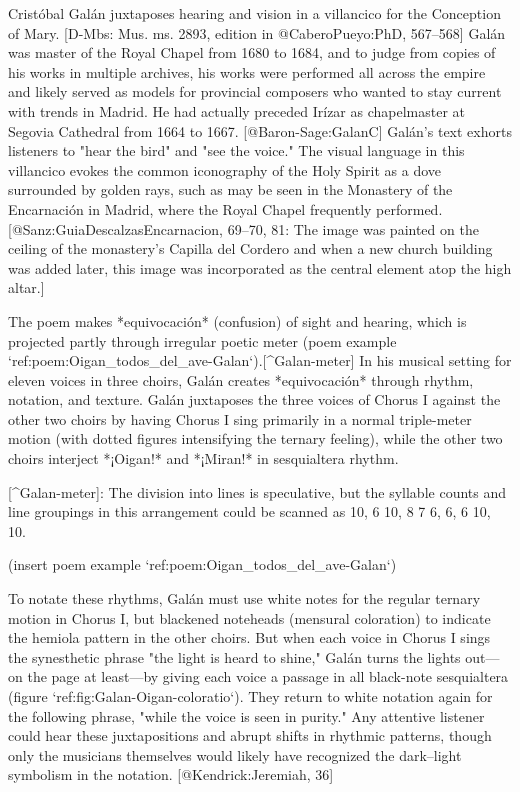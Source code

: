 Cristóbal Galán juxtaposes hearing and vision in a villancico
for the Conception of Mary. 
[D-Mbs: Mus. ms. 2893, edition in @CaberoPueyo:PhD, 567--568]
Galán was master of the Royal Chapel from 1680 to 1684, and to judge from
copies of his works in multiple archives, his works were performed all across
the empire and likely served as models for provincial composers who wanted to
stay current with trends in Madrid.
He had actually preceded Irízar as chapelmaster at Segovia Cathedral from 1664
to 1667.
[@Baron-Sage:GalanC]
Galán's text exhorts listeners to "hear the bird" and "see the voice."
The visual language in this villancico evokes the common iconography of the
Holy Spirit as a dove surrounded by golden rays, such as may be seen in the
Monastery of the Encarnación in Madrid, where the Royal Chapel frequently
performed.
[@Sanz:GuiaDescalzasEncarnacion, 69--70, 81:
The image was painted on the ceiling of the monastery's Capilla del Cordero and
when a new church building was added later, this image was incorporated as the
central element atop the high altar.]

The poem makes *equivocación* (confusion) of sight and hearing, which is
projected partly through irregular poetic meter (poem example
`ref:poem:Oigan_todos_del_ave-Galan`).[^Galan-meter] 
In his musical setting for eleven voices in three choirs, Galán creates
*equivocación* through rhythm, notation, and texture. 
Galán juxtaposes the three voices of Chorus I against the other two choirs by
having Chorus I sing primarily in a normal triple-meter motion (with dotted
figures intensifying the ternary feeling), while the other two choirs interject
*¡Oigan!* and *¡Miran!* in sesquialtera rhythm. 

[^Galan-meter]: 
The division into lines is speculative, but the syllable counts
and line groupings in this arrangement could be scanned as 
10, 6 10, 8 7 6, 6, 6 10, 10.

(insert poem example `ref:poem:Oigan_todos_del_ave-Galan`)
\label{poem:Oigan_todos_del_ave-Galan}

To notate these rhythms, Galán must use white notes for the regular ternary
motion in Chorus I, but blackened noteheads (mensural coloration) to indicate
the hemiola pattern in the other choirs. 
But when each voice in Chorus I sings the synesthetic phrase "the light is heard
to shine," Galán turns the lights out---on the page at least---by giving each
voice a passage in all black-note sesquialtera (figure
`ref:fig:Galan-Oigan-coloratio`).
They return to white notation again for the following phrase, "while the voice
is seen in purity." 
Any attentive listener could hear these juxtapositions and abrupt shifts in
rhythmic patterns, though only the musicians themselves would likely have
recognized the dark--light symbolism in the notation.
[@Kendrick:Jeremiah, 36]

